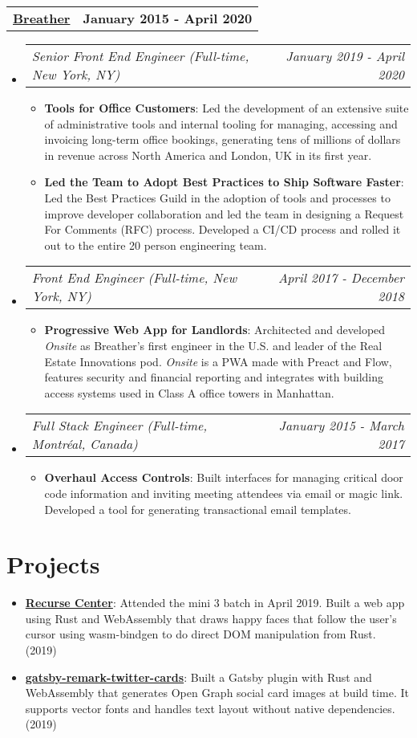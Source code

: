 \documentclass[letterpaper,10.8pt]{article}
\makeatletter
\newcommand{\resumeItem}[2]{
  \item\small{
    \textbf{#1}{: #2 \vspace{-2pt}}
  }
}
\newcommand{\jobLineItem}[2]{
  \vspace{0pt}\item[]
    \begin{tabular*}{0.98\textwidth}{l@{\extracolsep{\fill}}r}
      \textit{#1} & \textit{\small #2} \\
    \end{tabular*}\vspace{-4pt}
}
\newcommand{\employerTitle}[3]{
  \begin{tabular*}{1\textwidth}{l@{\extracolsep{\fill}}r}
    \href{#1}{\textbf{#2}} & \textbf{#3} \\
  \end{tabular*}\vspace{-4pt}
}
\newcommand{\resumeSubItem}[2]{\resumeItem{#1}{#2}\vspace{-5pt}}
\newcommand{\resumeSubHeadingListStart}{\begin{itemize}[leftmargin=*]}
\newcommand{\resumeSubHeadingListEnd}{\end{itemize}}
\newcommand{\resumeItemListStart}{\begin{itemize}}
\newcommand{\resumeItemListEnd}{\end{itemize}\vspace{-5pt}}
\makeatother
\begin{document}
  \employerTitle
    {https://breather.com}{Breather}{January 2015 - April 2020}
  \resumeSubHeadingListStart
    \jobLineItem
        {Senior Front End Engineer (Full-time, New York, NY)}{January 2019 - April 2020}
    \resumeItemListStart
        \resumeItem{Tools for Office Customers}
        {Led the development of an extensive suite of administrative tools and internal tooling for managing, accessing and invoicing long-term office bookings, generating tens of millions of dollars in revenue across North America and London, UK in its first year.}
        \resumeItem{Led the Team to Adopt Best Practices to Ship Software Faster}
        {Led the Best Practices Guild in the adoption of tools and processes to improve developer collaboration and led the team in designing a Request For Comments (RFC) process. Developed a CI/CD process and rolled it out to the entire 20 person engineering team.}
    \resumeItemListEnd
    \jobLineItem
        {Front End Engineer (Full-time, New York, NY)}{April 2017 - December 2018}
    \resumeItemListStart
        \resumeItem{Progressive Web App for Landlords}
        {Architected and developed \textit{Onsite} as Breather’s first engineer in the U.S. and leader of the Real Estate Innovations pod. \textit{Onsite} is a PWA made with Preact and Flow, features security and financial reporting and integrates with building access systems used in Class A office towers in Manhattan.}
      \resumeItemListEnd
    \jobLineItem
		    {Full Stack Engineer (Full-time, Montréal, Canada)}{January 2015 - March 2017}
		\resumeItemListStart
        \resumeItem{Overhaul Access Controls}
        {Built interfaces for managing critical door code information and inviting meeting attendees via email or magic link. Developed a tool for generating transactional email templates.}
    \resumeItemListEnd
    \resumeSubHeadingListEnd

\section{Projects}
\resumeSubHeadingListStart
\resumeSubItem{\href{https://github.com/alessbell/lines}{Recurse Center}}{Attended the mini 3 batch in April 2019. Built a web app using Rust and WebAssembly that draws happy faces that follow the user's cursor using wasm-bindgen to do direct DOM manipulation from Rust. (2019)}
\resumeSubItem{\href{https://aless.co/gatsby-wasm-plugin/}{gatsby-remark-twitter-cards}}{Built a Gatsby plugin with Rust and WebAssembly that generates Open Graph social card images at build time. It supports vector fonts and handles text layout without native dependencies. (2019)}
\vspace{5px}
\resumeSubHeadingListEnd
\end{document}
